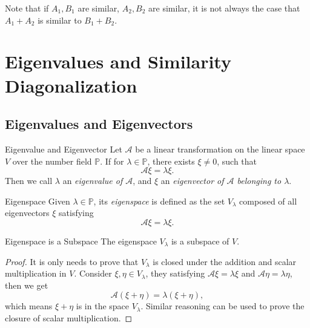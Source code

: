 \begin{note}
  Note that if $A_1, B_1$ are similar, $A_2, B_2$ are similar,
  it is not always the case that $A_1 + A_2$ is similar to $B_1 + B_2$.
\end{note}

\section{Eigenvalues and Similarity Diagonalization}

\subsection{Eigenvalues and Eigenvectors}

\begin{definition}{Eigenvalue and Eigenvector}{}
  Let $\mathcal{A}$ be a linear transformation on the linear space $V$ over the number
  field $\mathbb{P}$.
  If for $\lambda \in \mathbb{P}$, there exists $\xi \neq 0$,
  such that
  \begin{equation}
    \mathcal{A} \xi = \lambda \xi.
  \end{equation}
  Then we call $\lambda$ an \emph{eigenvalue of $\mathcal{A}$},
  and $\xi$ an \emph{eigenvector of $\mathcal{A}$ belonging to $\lambda$}.
\end{definition}

\begin{definition}{Eigenspace}{}
  Given $\lambda \in \mathbb{P}$,
  its \emph{eigenspace} is defined as the set $V_{\lambda}$
  composed of all eigenvectors $\xi$ satisfying
  \begin{equation}
    \mathcal{A} \xi = \lambda \xi.
  \end{equation}
\end{definition}

\begin{proposition}{Eigenspace is a Subspace}{}
  The eigenspace $V_{\lambda}$ is a subspace of $V$.
\end{proposition}

\begin{proof}
  It is only needs to prove that $V_{\lambda}$ is closed under the addition and
  scalar multiplication in $V$.
  Consider $\xi, \eta \in V_{\lambda}$, they satisfying $\mathcal{A}\xi =
  \lambda \xi$ and $\mathcal{A}\eta = \lambda \eta$,
  then we get
  \begin{equation}
    \mathcal{A}(\xi + \eta) = \lambda (\xi + \eta),
  \end{equation}
  which means $\xi + \eta$ is in the space $V_{\lambda}$.
  Similar reasoning can be used to prove the closure of scalar multiplication.
\end{proof}

